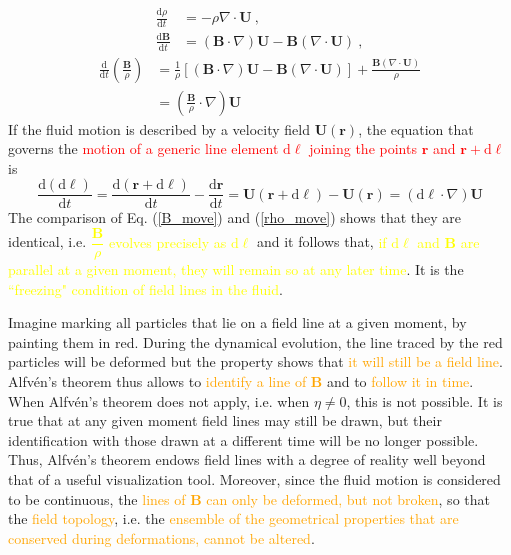 \documentclass[12pt,a4paper]{article}
\renewcommand{\vec}[1]{\boldsymbol{#1}}
\newcommand{\dif}{\mathrm{d}}
\newcounter{theo}[section]\setcounter{theo}{0}
\begin{document}
\begin{align*}
\frac{\dif \rho}{\dif t} &= -\rho \nabla \cdot \vec{U} ~, \\
\frac{\dif \vec{B} }{\dif t} &= (\vec{B} \cdot \nabla) \vec{U} -\vec{B}(\nabla \cdot \vec{U}) ~,
\end{align*}
\begin{align}
\frac{\dif }{\dif t} \left(\frac{\vec{B}}{\rho} \right) &= \frac{1}{\rho} [(\vec{B} \cdot \nabla) \vec{U} -\vec{B}(\nabla \cdot \vec{U})] +\frac{\vec{B}(\nabla \cdot \vec{U} )}{\rho} \\
&= \left( \frac{\vec{B}}{\rho} \cdot \nabla \right) \vec{U}
\label{B_move}
\end{align}
If the fluid motion is described by a velocity field $\vec{U}(\vec{r})$, the equation that governs the \textcolor{red}{motion of a generic line element $\dif  \vec{\ell}$ joining the points $\vec{r}$ and $\vec{r} + \dif \vec{\ell}$} is
\begin{equation}
\frac{\dif (\dif \vec{\ell})}{\dif t} = \frac{\dif (\vec{r} +\dif \vec{\ell})}{\dif t} -\frac{\dif \vec{r}}{\dif t} = \vec{U}(\vec{r} +\dif \vec{\ell}) -\vec{U}(\vec{r}) = (\dif \vec{\ell} \cdot \nabla)  \vec{U}
\label{rho_move}
\end{equation}
The comparison of Eq. (\ref{B_move}) and (\ref{rho_move}) shows that they are identical, i.e. \textcolor{yellow}{$\dfrac{\vec{B}}{\rho}$ evolves precisely as $\dif \vec{\ell}$} and it follows that, \textcolor{yellow}{if $\dif \vec{\ell}$ and $\vec{B}$ are parallel at a given moment, they will remain so at any later time}. It is the \textcolor{yellow}{``freezing" condition of field lines in the fluid}.

Imagine marking all particles that lie on a field line at a given moment, by painting them in red. During the dynamical evolution, the line traced by the red particles will be deformed but the property shows that \textcolor{orange}{it will still be a field line}. Alfv\'en's theorem thus allows to \textcolor{orange}{identify a line of $\vec{B}$} and to \textcolor{orange}{follow it in time}. When Alfv\'en's theorem does not apply, i.e. when $\eta \neq 0$, this is not possible. It is true that at any given moment field lines may still be drawn, but their identification with those drawn at a different time will be no longer possible. Thus, Alfv\'en's theorem endows field lines with a degree of reality well beyond that of a useful visualization tool. Moreover, since the fluid motion is considered to be continuous, the \textcolor{orange}{lines of $\vec{B}$ can only be deformed, but not broken}, so that the \textcolor{orange}{field topology}, i.e. the \textcolor{orange}{ensemble of the geometrical properties that are conserved during deformations, cannot be altered}.
\end{document}
